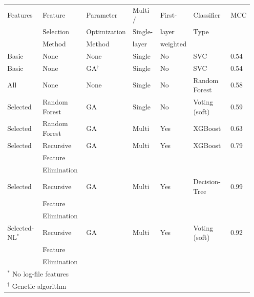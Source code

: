 \documentclass[12pt]{article}
\begin{document}
\begin{table}
  \small
  \begin{tabular}{lllllll}\hline
    Features        & Feature       & Parameter         & Multi- / & First-    & Classifier    & MCC  \\
                    & Selection     & Optimization      & Single-  & layer     & Type          &      \\
                    & Method        & Method            & layer    & weighted  &               &      \\ \hline
    Basic           & None          & None              & Single   & No        & SVC           & 0.54 \\
    Basic           & None          & GA$^\dag$         & Single   & No        & SVC           & 0.54 \\
    All             & None          & None              & Single   & No        & Random Forest & 0.58 \\
    Selected        & Random Forest & GA                & Single   & No        & Voting (soft)   & 0.59 \\
    Selected        & Random Forest & GA                & Multi    & Yes       & XGBoost       & 0.63 \\
    Selected        & Recursive     & GA                & Multi    & Yes       & XGBoost       & 0.79 \\
                    & Feature       &                   &          &           &               &      \\
                    & Elimination   &                   &          &           &               &      \\
    Selected        & Recursive     & GA                & Multi    & Yes       & Decision-Tree & 0.99 \\
                    & Feature       &                   &          &           &               &      \\
                    & Elimination   &                   &          &           &               &      \\
    Selected-NL$^*$ & Recursive     & GA                & Multi    & Yes       & Voting (soft) & 0.92 \\
                    & Feature       &                   &          &           &               &      \\
                    & Elimination   &                   &          &           &               &      \\ \hline
    \multicolumn{7}{l}{$^*$ No log-file features} \\
    \multicolumn{7}{l}{$^\dag$ Genetic algorithm} \\
    \end{tabular}
\end{table}
\end{document}
